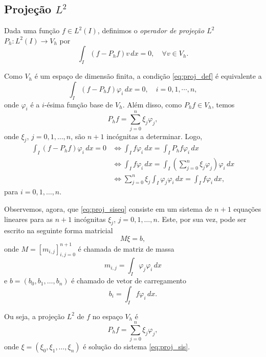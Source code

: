 \subsection{Projeção $L^2$}

Dada uma função $f\in L^2(I)$, definimos o \emph{operador de projeção $L^2$} $P_h:L^2(I)\to V_h$ por
\begin{equation}\label{eq:proj_def}
  \int_I (f-P_hf)v\,dx=0,\quad\forall v\in V_h.
\end{equation}

Como $V_h$ é um espaço de dimensão finita, a condição \eqref{eq:proj_def} é equivalente a
\begin{equation}\label{eq:proj_def}
  \int_I (f-P_hf)\varphi_i\,dx=0,\quad i=0, 1, \cdots, n,
\end{equation}
onde $\varphi_i$ é a $i$-ésima função base de $V_h$. Além disso, como $P_hf\in V_h$, temos
\begin{equation}
  P_hf = \sum_{j=0}^n\xi_j\varphi_j,
\end{equation}
onde $\xi_j$, $j=0, 1, \dotsc, n$, são $n+1$ incógnitas a determinar. Logo,
\begin{align}
  \int_I (f-P_hf)\varphi_i\,dx=0 &\Leftrightarrow \int_I f\varphi_i\,dx = \int_I P_hf\varphi_i\,dx\\
  &\Leftrightarrow \int_I f\varphi_i\,dx = \int_I \left(\sum_{j=0}^n \xi_j\varphi_j\right)\varphi_i\,dx\\
  &\Leftrightarrow \sum_{j=0}^n \xi_j\int_I\varphi_j\varphi_i\,dx = \int_I f\varphi_i\,dx,\label{eq:proj_siseq}
\end{align}
para $i=0, 1, \dotsc, n$.

Observemos, agora, que \eqref{eq:proj_siseq} consiste em um sistema de $n+1$ equações lineares para as $n+1$ incógnitas $\xi_j$, $j=0, 1, \dotsc, n$. Este, por sua vez, pode ser escrito na seguinte forma matricial
\begin{equation}\label{eq:proj_sis}
  M\xi = b,
\end{equation}
onde $M = [m_{i,j}]_{i,j=0}^{n+1}$ é chamada de matriz de massa
\begin{equation}
  m_{i,j} = \int_I\varphi_j\varphi_i\,dx
\end{equation}
e $b = (b_0, b_1, \dotsc, b_n)$ é chamado de vetor de carregamento
\begin{equation}
  b_i = \int_I f\varphi_i\,dx.
\end{equation}

Ou seja, a projeção $L^2$ de $f$ no espaço $V_h$ é
\begin{equation}
  P_hf = \sum_{j=0}^n\xi_j\varphi_j,
\end{equation}
onde $\xi = (\xi_0, \xi_1, \dotsc, \xi_n)$ é solução do sistema \eqref{eq:proj_sis}.

